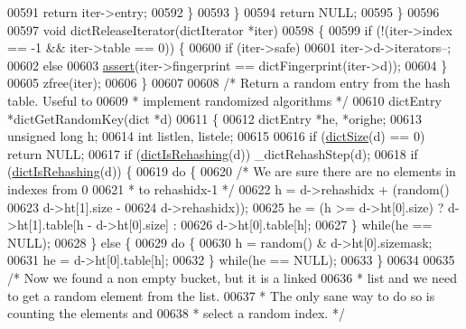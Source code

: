 \begin{DoxyCode}
00591             \textcolor{keywordflow}{return} iter->entry;
00592         \}
00593     \}
00594     \textcolor{keywordflow}{return} NULL;
00595 \}
00596 
00597 \textcolor{keywordtype}{void} dictReleaseIterator(dictIterator *iter)
00598 \{
00599     \textcolor{keywordflow}{if} (!(iter->index == -1 && iter->table == 0)) \{
00600         \textcolor{keywordflow}{if} (iter->safe)
00601             iter->d->iterators--;
00602         \textcolor{keywordflow}{else}
00603             \hyperlink{redisassert_8h_a993abaa2c168852c1592879472938781}{assert}(iter->fingerprint == dictFingerprint(iter->d));
00604     \}
00605     zfree(iter);
00606 \}
00607 
00608 \textcolor{comment}{/* Return a random entry from the hash table. Useful to}
00609 \textcolor{comment}{ * implement randomized algorithms */}
00610 dictEntry *dictGetRandomKey(dict *d)
00611 \{
00612     dictEntry *he, *orighe;
00613     \textcolor{keywordtype}{unsigned} \textcolor{keywordtype}{long} h;
00614     \textcolor{keywordtype}{int} listlen, listele;
00615 
00616     \textcolor{keywordflow}{if} (\hyperlink{dict_8h_af193430dd3d5579a52b194512f72c1f0}{dictSize}(d) == 0) \textcolor{keywordflow}{return} NULL;
00617     \textcolor{keywordflow}{if} (\hyperlink{dict_8h_aa6e4917a6a32fdf47180e03ed8969e02}{dictIsRehashing}(d)) \_dictRehashStep(d);
00618     \textcolor{keywordflow}{if} (\hyperlink{dict_8h_aa6e4917a6a32fdf47180e03ed8969e02}{dictIsRehashing}(d)) \{
00619         \textcolor{keywordflow}{do} \{
00620             \textcolor{comment}{/* We are sure there are no elements in indexes from 0}
00621 \textcolor{comment}{             * to rehashidx-1 */}
00622             h = d->rehashidx + (random() %
00623                                             d->ht[1].size -
00624                                             d->rehashidx));
00625             he = (h >= d->ht[0].size) ? d->ht[1].table[h - d->ht[0].size] :
00626                                       d->ht[0].table[h];
00627         \} \textcolor{keywordflow}{while}(he == NULL);
00628     \} \textcolor{keywordflow}{else} \{
00629         \textcolor{keywordflow}{do} \{
00630             h = random() & d->ht[0].sizemask;
00631             he = d->ht[0].table[h];
00632         \} \textcolor{keywordflow}{while}(he == NULL);
00633     \}
00634 
00635     \textcolor{comment}{/* Now we found a non empty bucket, but it is a linked}
00636 \textcolor{comment}{     * list and we need to get a random element from the list.}
00637 \textcolor{comment}{     * The only sane way to do so is counting the elements and}
00638 \textcolor{comment}{     * select a random index. */}

\end{DoxyCode}
